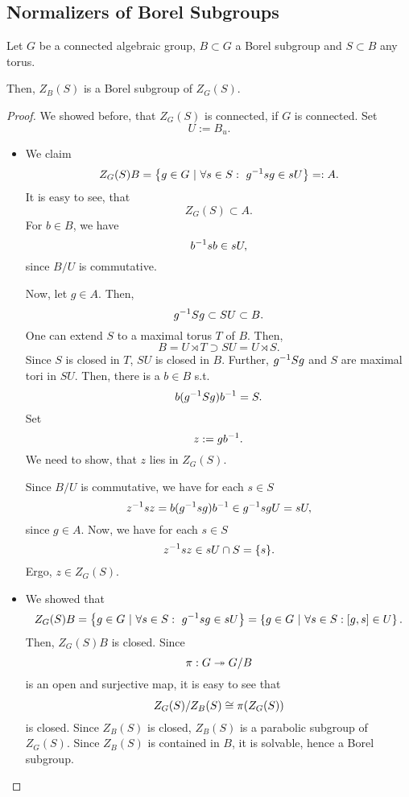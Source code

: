 \subsection{Normalizers of Borel Subgroups}

\begin{lemma}
	Let $G$ be a connected algebraic group, $B \subset G$ a Borel subgroup and $S \subset B$ any torus.
	
	Then, $Z_B(S)$ is a Borel subgroup of $Z_G(S)$.
\end{lemma}
\begin{proof}
	We showed before, that $Z_G(S)$ is connected, if $G$ is connected.
	Set
	\[ U:= B_u. \]
	\begin{itemize}
		\item We claim
		\[ Z_G(S) B = \left\lbrace g \in G ~ | ~ \forall s \in S:~g^{-1} s g \in sU\right\rbrace =:A. \]
		It is easy to see, that
		\[ Z_G(S) \subset A. \]
		For $b \in B$, we have
		\[ b^{-1} sb\in sU, \]
		since $B/U$ is commutative.
		
		Now, let $g \in A$. Then,
		\[ g^{-1} S g \subset SU \subset B. \]
		One can extend $S$ to a maximal torus $T$ of $B$. Then,
		\[ B = U \rtimes T \supset SU = U \rtimes S.\]
Since $S$ is closed in $T$, $SU$ is closed in $B$. Further, $g^{-1} S g$ and $S$ are maximal tori in $SU$. Then, there is a $b \in B$ s.t.
\[ b(g^{-1} S g)b^{-1} = S. \]
Set
\[ z:= gb^{-1}. \]
We need to show, that $z$ lies in $Z_G(S)$.

Since $B/U$ is commutative, we have for each $s \in S$
\[ z^{-1} s z = b(g^{-1} s g)b^{-1} \in g^{-1} s g U= sU, \]
since $g \in A$.
Now, we have for each $s \in S$
\[ z^{-1} s z \in sU \cap S = \{s\}.  \]
Ergo, $z \in Z_G(S)$.
\item We showed that
\[ Z_G(S) B = \left\lbrace g \in G ~ | ~ \forall s \in S:~g^{-1} s g \in sU\right\rbrace = \left\lbrace g \in G ~ | ~ \forall s \in S:[g,s] \in U\right\rbrace. \]
Then, $Z_G(S)B$ is closed. Since
\[ \pi : G \overset{}{\twoheadrightarrow} G/B \]
is an open and surjective map, it is easy to see that
\[ Z_G(S) / Z_B(S) \overset{}{\cong} \pi(Z_G(S)) \]
is closed. Since $Z_B(S)$ is closed, $Z_B(S)$ is a parabolic subgroup of $Z_G(S)$. Since $Z_B(S)$ is contained in $B$, it is solvable, hence a Borel subgroup.
	\end{itemize}
\end{proof}

